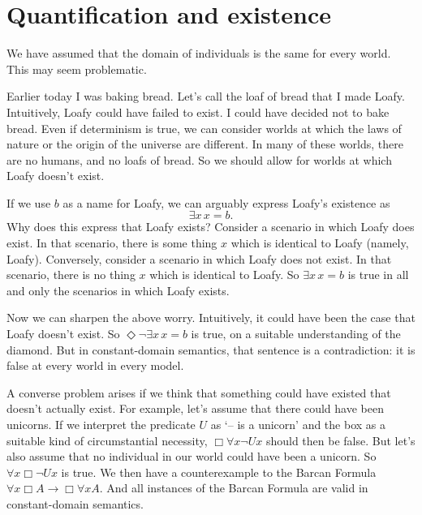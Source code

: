 \section{Quantification and existence}

We have assumed that the domain of individuals is the same for every world. This
may seem problematic.

Earlier today I was baking bread. Let's call the loaf of bread that I made
Loafy. Intuitively, Loafy could have failed to exist. I could have decided not
to bake bread. Even if determinism is true, we can consider worlds at which the
laws of nature or the origin of the universe are different. In many of these
worlds, there are no humans, and no loafs of bread. So we should allow for
worlds at which Loafy doesn't exist.

If we use $b$ as a name for Loafy, we can arguably express Loafy's existence as
\[
  \exists x \,x\!=\!b.
\]
Why does this express that Loafy exists? Consider a scenario in which Loafy does
exist. In that scenario, there is some thing $x$ which is identical to Loafy
(namely, Loafy). Conversely, consider a scenario in which Loafy does not exist.
In that scenario, there is no thing $x$ which is identical to Loafy. So
$\exists x\, x\!=\!b$ is true in all and only the scenarios in which Loafy exists.

Now we can sharpen the above worry. Intuitively, it could have been the case
that Loafy doesn't exist. So $\Diamond \neg \exists x\, x\!=\!b$ is true, on a
suitable understanding of the diamond. But in constant-domain semantics, that
sentence is a contradiction: it is false at every world in every model.

A converse problem arises if we think that something could have existed that
doesn't actually exist. For example, let's assume that there could have been
unicorns. If we interpret the predicate $U$ as `-- is a unicorn' and the box as
a suitable kind of circumstantial necessity, $\Box \forall x \neg Ux$ should
then be false. But let's also assume that no individual in our world could have
been a unicorn. So $\forall x \Box \neg Ux$ is true. We then have a
counterexample to the Barcan Formula $\forall x \Box A \to \Box \forall x A$.
And all instances of the Barcan Formula are valid in constant-domain semantics.


